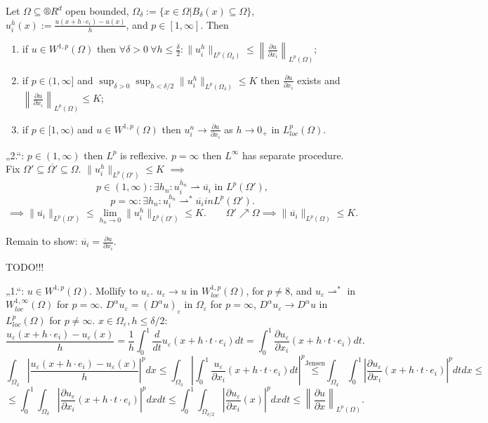 \documentclass[12pt]{article}					%
\begin{document}
\begin{veta}
	Let $Ω \subseteq ®R^d$ open bounded, $Ω_δ := \{x \in Ω | B_δ(x) \subseteq Ω\}$, $u_i^h(x) := \frac{u(x + h·e_i) - u(x)}{h}$, and $p \in [1, ∞]$. Then

	\begin{enumerate}
		\item if $u \in W^{1, p}(Ω)$ then $\forall δ > 0\ \forall h ≤ \frac{δ}{2}: \|u_i^h\|_{L^p(Ω_δ)} ≤ \left\|\frac{\partial u}{\partial x_i}\right\|_{L^p(Ω)}$;
		\item if $p \in (1, ∞]$ and $\sup_{δ > 0} \sup_{h < δ / 2} \|u_i^h\|_{L^p(Ω_δ)} ≤ K$ then $\frac{\partial u}{\partial x_i}$ exists and $\left\|\frac{\partial u}{\partial x_i}\right\|_{L^p(Ω)} ≤ K$;
		\item if $p \in [1, ∞)$ and $u \in W^{1, p}(Ω)$ then $u_i^n \rightarrow \frac{\partial u}{\partial x_i}$ as $h \rightarrow 0_+$ in $L^p_{loc}(Ω)$.
	\end{enumerate}

	\begin{dukazin}
		„2.“: $p \in (1, ∞)$ then $L^p$ is reflexive. $p = ∞$ then $L^∞$ has separate procedure. Fix $Ω' \subseteq \overline{Ω'} \subseteq Ω$. $\|u_i^h\|_{L^p(Ω')} ≤ K$ $\implies$
		$$ p \in (1, ∞): \exists h_n: u_i^{h_n} \rightharpoonup \overline{u_i} \text{ in } L^p(Ω'), $$
		$$ p = ∞: \exists h_n: u_i^{h_n} \rightharpoonup^* \overline{u_i} in L^p(Ω'). $$
		$$ \implies \|\overline{u_i}\|_{L^p(Ω')} ≤ \lim_{h_n \rightarrow 0} \|u_i^h\|_{L^p(Ω')} ≤ K. \qquad Ω' \nearrow Ω \implies \|\overline{u_i}\|_{L^p(Ω)} ≤ K. $$

		Remain to show: $\overline{u_i} = \frac{\partial u}{\partial x_i}$.

		TODO!!!

		„1.“: $u \in W^{1, p}(Ω)$. Mollify to $u_ε$. $u_ε \rightarrow u$ in $W^{1, p}_{loc} (Ω)$, for $p ≠ 8$, and $u_ε \rightharpoonup^*$ in $W^{1, ∞}_{loc}(Ω)$ for $p = ∞$. $D^α u_ε = (D^α u)_ε$ in $Ω_ε$ for $p = ∞$, $D^α u_ε \rightarrow D^α u$ in $L^p_{loc}(Ω)$ for $p ≠ ∞$. $x \in Ω_ε, h ≤ δ/2$:
		$$ \frac{u_ε(x + h·e_i) - u_ε(x)}{h} = \frac{1}{h} \int_0^1 \frac{d}{dt} u_ε(x + h·t·e_i)dt = \int_0^1 \frac{\partial u_ε}{\partial x_i}(x + h·t·e_i) dt. $$
		$$ \int_{Ω_δ} \left| \frac{u_ε(x + h·e_i) - u_ε(x)}{h}\right|^p dx ≤ \int_{Ω_δ} \left| \int_0^1 \frac{u_ε}{\partial x_i}(x + h·t·e_i) dt \right|^p \overset{\text{Jensen}}≤ \int_{Ω_δ} \int_0^1 \left| \frac{\partial u_ε}{\partial x_i}(x + h·t·e_i)\right|^p dt dx ≤ $$
		$$ ≤ \int_0^1 \int_{Ω_δ} \left| \frac{\partial u_ε}{\partial x_i}(x + h·t·e_i)\right|^p dx dt ≤ \int_0^1 \int_{Ω_{δ/2}} \left| \frac{\partial u_ε}{\partial x_i}(x)\right|^p dx dt ≤ \left\|\frac{\partial u}{\partial x}\right\|_{L^p(Ω)}. $$


\end{dukazin}
\end{veta}
\end{document}
